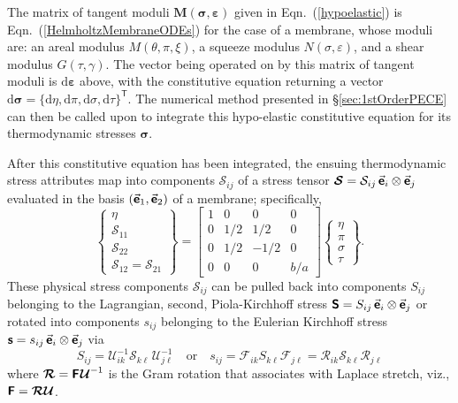 The matrix of tangent moduli $\mathbf{M} ( \boldsymbol{\sigma} , \boldsymbol{\varepsilon} )$ given in Eqn.~(\ref{hypoelastic}) is Eqn.~(\ref{HelmholtzMembraneODEs}) for the case of a membrane, whose moduli are: an areal modulus $M(\theta , \pi , \xi)$, a squeeze modulus $N( \sigma , \varepsilon )$, and a shear modulus $G( \tau , \gamma )$.  The vector being operated on by this matrix of tangent moduli is $\mathrm{d} \boldsymbol{\varepsilon}$ above, with the constitutive equation returning a vector $\mathrm{d} \boldsymbol{\sigma} = \{ \mathrm{d} \eta , \mathrm{d} \pi , \mathrm{d} \sigma , \mathrm{d} \tau \}^{\mathsf{T}}$.  The numerical method presented in \S\ref{sec:1stOrderPECE} can then be called upon to integrate this hypo-elastic constitutive equation for its thermo\-dynamic stresses $\boldsymbol{\sigma}$.  

After this constitutive equation has been integrated, the ensuing thermo\-dynamic stress attributes map into components $\mathcal{S}_{ij}$ of a stress tensor $\boldsymbol{\mathcal{S}} = \mathcal{S}_{ij} \, \vec{\boldsymbol{\mathsf{e}}}_i \otimes \vec{\boldsymbol{\mathsf{e}}}_j$ evaluated in the basis $( \vec{\boldsymbol{\mathsf{e}}}_1 , \vec{\boldsymbol{\mathsf{e}}}_2 )$ of a membrane; specifically,
\begin{equation}
   \left\{ \begin{matrix}
   \eta \\ \mathcal{S}_{11} \\ \mathcal{S}_{22} \\ \mathcal{S}_{12} = \mathcal{S}_{21}
   \end{matrix} \right\} = \begin{bmatrix}
   1 & 0 & 0 & 0 \\
   0 & 1/2 & 1/2 & 0 \\
   0 & 1/2 & -1/2 & 0 \\
   0 & 0 & 0 & b / a
   \end{bmatrix}
   \left\{ \begin{matrix}
   \eta \\ \pi \\ \sigma \\ \tau
   \end{matrix} \right\} .
\end{equation}
These physical stress components $\mathcal{S}_{ij}$ can be pulled back into components $S_{ij}$ belonging to the Lagrangian, second, Piola-Kirchhoff stress $\boldsymbol{\mathsf{S}} = S_{ij} \, \vec{\boldsymbol{\mathsf{e}}}_i \otimes \vec{\boldsymbol{\mathsf{e}}}_j$ or rotated into components $s_{ij}$ belonging to the Eulerian Kirchhoff stress $\boldsymbol{\mathsf{s}} = s_{ij} \, \vec{\boldsymbol{\mathsf{e}}}_i \otimes \vec{\boldsymbol{\mathsf{e}}}_j$ via 
\begin{equation}
    S_{ij} = \mathcal{U}^{-1}_{ik} \mathcal{S}_{k\ell\,} \mathcal{U}^{-1}_{j\ell}
    \quad \text{or} \quad
    s_{ij} = \mathcal{F}_{ik} S_{k\ell} \mathcal{F}_{j\ell} = 
    \mathcal{R}_{ik} \mathcal{S}_{k\ell} \mathcal{R}_{j\ell}
    \label{membraneStresses}
\end{equation}
where $\boldsymbol{\mathcal{R}} = \boldsymbol{\mathsf{F}} \hspace{0.5pt} \boldsymbol{\mathcal{U}}^{-1}$ is the Gram rotation that associates with Laplace stretch, viz., $\boldsymbol{\mathsf{F}} = \boldsymbol{\mathcal{RU}}$. 

